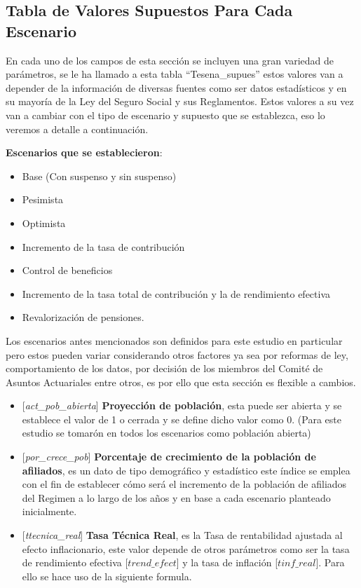 \documentclass[
  letterpaper,
  DIV=11,
  numbers=noendperiod]{scrreprt}
\begin{document}
\hypertarget{tabla-de-valores-supuestos-para-cada-escenario}{%
\subsection{Tabla de Valores Supuestos Para Cada
Escenario}\label{tabla-de-valores-supuestos-para-cada-escenario}}

En cada uno de los campos de esta sección se incluyen una gran variedad
de parámetros, se le ha llamado a esta tabla ``Tesena\_supues'' estos
valores van a depender de la información de diversas fuentes como ser
datos estadísticos y en su mayoría de la Ley del Seguro Social y sus
Reglamentos. Estos valores a su vez van a cambiar con el tipo de
escenario y supuesto que se establezca, eso lo veremos a detalle a
continuación.

\textbf{Escenarios que se establecieron}:

\begin{itemize}
\item
  Base (Con suspenso y sin suspenso)
\item
  Pesimista
\item
  Optimista
\item
  Incremento de la tasa de contribución
\item
  Control de beneficios
\item
  Incremento de la tasa total de contribución y la de rendimiento
  efectiva
\item
  Revalorización de pensiones.
\end{itemize}

Los escenarios antes mencionados son definidos para este estudio en
particular pero estos pueden variar considerando otros factores ya sea
por reformas de ley, comportamiento de los datos, por decisión de los
miembros del Comité de Asuntos Actuariales entre otros, es por ello que
esta sección es flexible a cambios.

\begin{itemize}
\item
  {[}\emph{act\_pob\_abierta}{]} \textbf{Proyección de población}, esta
  puede ser abierta y se establece el valor de 1 o cerrada y se define
  dicho valor como 0. (Para este estudio se tomarón en todos los
  escenarios como población abierta)
\item
  {[}\emph{por\_crece\_pob}{]} \textbf{Porcentaje de crecimiento de la
  población de afiliados}, es un dato de tipo demográfico y estadístico
  este índice se emplea con el fin de establecer cómo será el incremento
  de la población de afiliados del Regimen a lo largo de los años y en
  base a cada escenario planteado inicialmente.
\item
  {[}\emph{ttecnica\_real}{]} \textbf{Tasa Técnica Real}, es la Tasa de
  rentabilidad ajustada al efecto inflacionario, este valor depende de
  otros parámetros como ser la tasa de rendimiento efectiva
  {[}\(trend\_{efect}\){]} y la tasa de inflación
  {[}\(tinf\_{real}\){]}. Para ello se hace uso de la siguiente formula.
\end{itemize}
\end{document}

